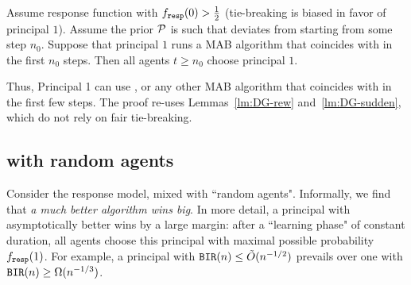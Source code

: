 

\begin{theorem}\label{thm:HardMax-biased}
Assume \HardMax response function with $f_{\mathtt{resp}}(0)>\tfrac12$ (\ie tie-breaking is biased in favor of principal $1$). Assume the prior $\mathcal{P}$ is such that \DynGreedy deviates from \StaticGreedy starting from some step $n_0$. Suppose that principal $1$ runs a \bmonotone MAB algorithm that coincides with \DynGreedy in the first $n_0$ steps. Then all agents $t\geq n_0$ choose principal $1$.
\end{theorem}

Thus, Principal 1 can use \DynGreedy, or any other \bmonotone MAB algorithm that coincides with \DynGreedy in the first few steps.
The proof re-uses Lemmas~\ref{lm:DG-rew} and~\ref{lm:DG-sudden}, which do not rely on fair tie-breaking.



\subsection{\HardMax with random agents}
\label{sec:theory-HMR}

Consider the \HardMaxRandom response model, \ie \HardMax mixed with ``random agents".
Informally, we find that
\emph{a much better algorithm wins big}.
In more detail, a principal with asymptotically better \BIR wins by a large margin: after a ``learning phase" of constant duration, all agents choose this principal with maximal possible probability $f_{\mathtt{resp}}(1)$. For example, a principal with $\mathtt{BIR}(n)\leq \tilde{O}(n^{-1/2})$ prevails over one with $\mathtt{BIR}(n)\geq \Omega(n^{-1/3})$.



